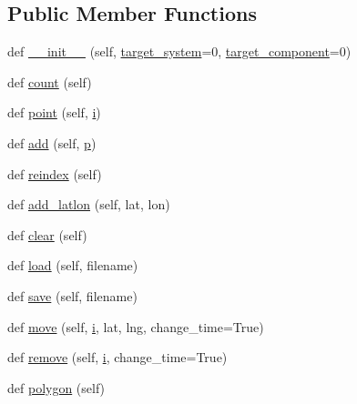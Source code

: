 \subsection*{Public Member Functions}
\begin{DoxyCompactItemize}
\item 
def \mbox{\hyperlink{classpymavlink_1_1mavwp_1_1MAVFenceLoader_ad2c36ce95b96d8ccb0d182254b64a75a}{\+\_\+\+\_\+init\+\_\+\+\_\+}} (self, \mbox{\hyperlink{classpymavlink_1_1mavwp_1_1MAVFenceLoader_ad95b9bdad05fdf89e63f52ffd2c8aa87}{target\+\_\+system}}=0, \mbox{\hyperlink{classpymavlink_1_1mavwp_1_1MAVFenceLoader_a38751985c2a37046971dcd69a83b8370}{target\+\_\+component}}=0)
\item 
def \mbox{\hyperlink{classpymavlink_1_1mavwp_1_1MAVFenceLoader_ad1ba7f8d238b1ff9fba27f1ac45a4174}{count}} (self)
\item 
def \mbox{\hyperlink{classpymavlink_1_1mavwp_1_1MAVFenceLoader_adf811be126be216f243c8c3e5410095b}{point}} (self, \mbox{\hyperlink{velTest_8cpp_a1239420b8759f52cbab64225b82461e2}{i}})
\item 
def \mbox{\hyperlink{classpymavlink_1_1mavwp_1_1MAVFenceLoader_a58e43bc724a67d155e5746e7abf3d31e}{add}} (self, \mbox{\hyperlink{velTest_8cpp_a739e18b8b6d072d434ebcb6ca486abb0}{p}})
\item 
def \mbox{\hyperlink{classpymavlink_1_1mavwp_1_1MAVFenceLoader_aa556e6ef7a6379e42ec797f3b2f376b1}{reindex}} (self)
\item 
def \mbox{\hyperlink{classpymavlink_1_1mavwp_1_1MAVFenceLoader_adfb4b572f7ecfa4bee52c3f62e42915f}{add\+\_\+latlon}} (self, lat, lon)
\item 
def \mbox{\hyperlink{classpymavlink_1_1mavwp_1_1MAVFenceLoader_a892ccc569e1dcae04f5b9a9219849c0b}{clear}} (self)
\item 
def \mbox{\hyperlink{classpymavlink_1_1mavwp_1_1MAVFenceLoader_a31e6f593846fa95c782d1567215cb141}{load}} (self, filename)
\item 
def \mbox{\hyperlink{classpymavlink_1_1mavwp_1_1MAVFenceLoader_a34fdb2bc4e79b7649714adb5d0bfd667}{save}} (self, filename)
\item 
def \mbox{\hyperlink{classpymavlink_1_1mavwp_1_1MAVFenceLoader_a3a8c6237c42535dd031f28da0a9139ea}{move}} (self, \mbox{\hyperlink{velTest_8cpp_a1239420b8759f52cbab64225b82461e2}{i}}, lat, lng, change\+\_\+time=True)
\item 
def \mbox{\hyperlink{classpymavlink_1_1mavwp_1_1MAVFenceLoader_a7c1a07eaf7b428d33bc963335ae4d5bd}{remove}} (self, \mbox{\hyperlink{velTest_8cpp_a1239420b8759f52cbab64225b82461e2}{i}}, change\+\_\+time=True)
\item 
def \mbox{\hyperlink{classpymavlink_1_1mavwp_1_1MAVFenceLoader_a9c0857c45d7a72d6e9dfd80246816f8e}{polygon}} (self)
\end{DoxyCompactItemize}
